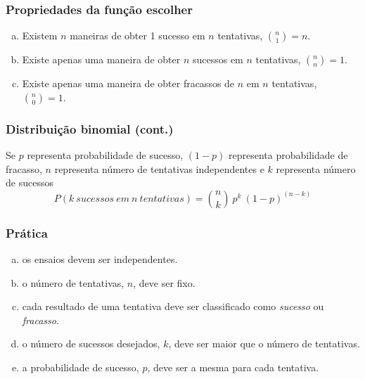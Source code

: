 
\begin{frame}[fragile]
\frametitle{Propriedades da função escolher}
\justifying
{}

\begin{enumerate}[(a)]
\justifying
\item Existem $ n $ maneiras de obter 1 sucesso em $ n $ tentativas, ${n \choose 1} = n$.
\justifying
\item Existe apenas uma maneira de obter $ n $ sucessos em $ n $ tentativas, ${n \choose n} = 1$.
\justifying
\item Existe apenas uma maneira de obter fracassos de $ n $ em $ n $ tentativas, ${n \choose 0} = 1$.
\justifying
{}
\end{enumerate}

\end{frame}


\begin{frame}
\frametitle{Distribuição binomial (cont.)}
\justifying
{}
{
\justifying
Se $ p $ representa probabilidade de sucesso, $ (1-p) $ representa probabilidade de fracasso, $ n $ representa número de tentativas independentes e $ k $ representa número de sucessos
\[P(k~sucessos~em~n~tentativas) = {n \choose k}~p^k~(1-p)^{(n-k)} \]
} 


\end{frame}


\begin{frame}
\frametitle{Prática}
\justifying
{}

\begin{enumerate}[(a)]
\justifying
\item os ensaios devem ser independentes.
\justifying
\item o número de tentativas, $ n $, deve ser fixo.
\justifying
\item cada resultado de uma tentativa deve ser classificado como \textit{sucesso} ou \textit{fracasso}.
\justifying
\item o número de sucessos desejados, $ k $, deve ser maior que o número de tentativas.
\justifying
\item a probabilidade de sucesso, $ p $, deve ser a mesma para cada tentativa.
\end{enumerate}

\end{frame}

